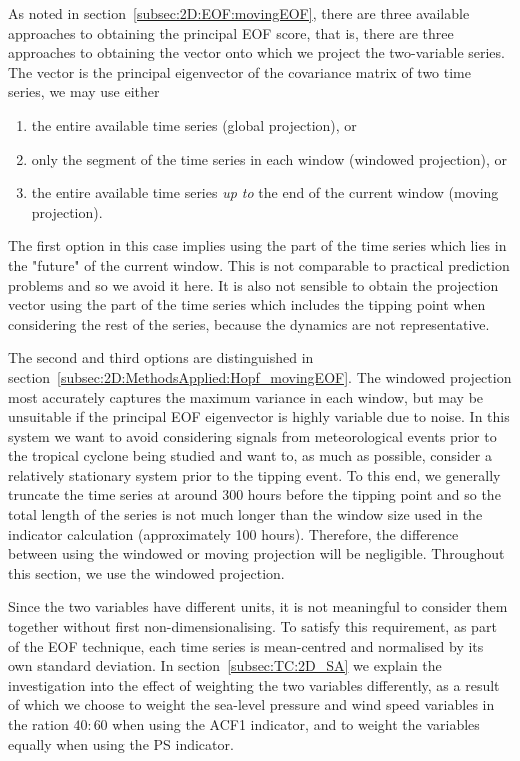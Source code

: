 As noted in section~\ref{subsec:2D:EOF:movingEOF}, there are three available approaches to obtaining the principal EOF score, that is, there are three approaches to obtaining the vector onto which we project the two-variable series. The vector is the principal eigenvector of the covariance matrix of two time series, we may use either
\begin{enumerate}
	\item the entire available time series (global projection), or
	\item only the segment of the time series in each window (windowed projection), or
	\item the entire available time series \emph{up to} the end of the current window (moving projection).
\end{enumerate}
The first option in this case implies using the part of the time series which lies in the "future" of the current window. This is not comparable to practical prediction problems and so we avoid it here. It is also not sensible to obtain the projection vector using the part of the time series which includes the tipping point when considering the rest of the series, because the dynamics are not representative. 

The second and third options are distinguished in section~\ref{subsec:2D:MethodsApplied:Hopf_movingEOF}. The windowed projection most accurately captures the maximum variance in each window, but may be unsuitable if the principal EOF eigenvector is highly variable due to noise. In this system we want to avoid considering signals from meteorological events prior to the tropical cyclone being studied and want to, as much as possible, consider a relatively stationary system prior to the tipping event. To this end, we generally truncate the time series at around 300 hours before the tipping point and so the total length of the series is not much longer than the window size used in the indicator calculation (approximately 100 hours). Therefore, the difference between using the windowed or moving projection will be negligible. Throughout this section, we use the windowed projection.

Since the two variables have different units, it is not meaningful to consider them together without first non-dimensionalising. To satisfy this requirement, as part of the EOF technique, each time series is mean-centred and normalised by its own standard deviation. In section~\ref{subsec:TC:2D_SA} we explain the investigation into the effect of weighting the two variables differently, as a result of which we choose to weight the sea-level pressure and wind speed variables in the ration $40:60$ when using the ACF1 indicator, and to weight the variables equally when using the PS indicator.

